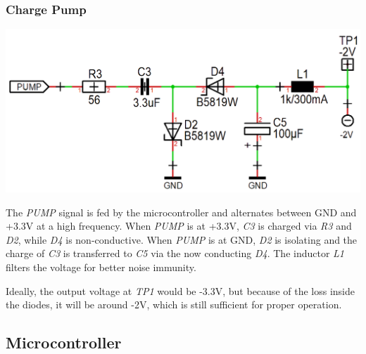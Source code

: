 \documentclass{scrartcl}
\begin{document}
\subsubsection{Charge Pump}

\begin{center}
    \includegraphics[scale=0.3]{assets/schema-pump.png}
\end{center}

The \emph{PUMP} signal is fed by the microcontroller and alternates between GND and +3.3V at a high frequency. When \emph{PUMP} is at +3.3V, \emph{C3} is charged via \emph{R3} and \emph{D2}, while \emph{D4} is non-conductive. When \emph{PUMP} is at GND, \emph{D2} is isolating and the charge of \emph{C3} is transferred to \emph{C5} via the now conducting \emph{D4}. The inductor \emph{L1} filters the voltage for better noise immunity.

Ideally, the output voltage at \emph{TP1} would be -3.3V, but because of the loss inside the diodes, it will be around -2V, which is still sufficient for proper operation.

\subsection{Microcontroller}
\end{document}
